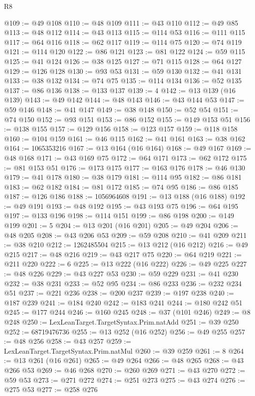 \begin{lexlean}{R8}
\begin{coremodule}
@109 := @49 @108
@110 := @48 @109
@111 := @43 @110
@112 := @49 @85
@113 := @48 @112
@114 := @43 @113
@115 := @114 @53
@116 := @111 @115
@117 := @64 @116
@118 := @62 @117
@119 := @114 @75
@120 := @74 @119
@121 := @114 @120
@122 := @86 @121
@123 := @81 @122
@124 := @59 @115
@125 := @41 @124
@126 := @38 @125
@127 := @71 @115
@128 := @64 @127
@129 := @126 @128
@130 := @93 @53
@131 := @59 @130
@132 := @41 @131
@133 := @38 @132
@134 := @74 @75
@135 := @114 @134
@136 := @52 @135
@137 := @86 @136
@138 := @133 @137
@139 := 4
@142 := @13 @139 (@16 @139)
@143 := @49 @142
@144 := @48 @143
@146 := @43 @144 @53
@147 := @59 @146
@148 := @41 @147
@149 := @38 @148
@150 := @52 @54
@151 := @74 @150
@152 := @93 @151
@153 := @86 @152
@155 := @149 @153 @51
@156 := @138 @155
@157 := @129 @156
@158 := @123 @157
@159 := @118 @158
@160 := @104 @159
@161 := @46 @115
@162 := @41 @161
@163 := @38 @162
@164 := 1065353216
@167 := @13 @164 (@16 @164)
@168 := @49 @167
@169 := @48 @168
@171 := @43 @169 @75
@172 := @64 @171
@173 := @62 @172
@175 := @81 @153 @51
@176 := @173 @175
@177 := @163 @176
@178 := @46 @130
@179 := @41 @178
@180 := @38 @179
@181 := @114 @95
@182 := @86 @181
@183 := @62 @182
@184 := @81 @172
@185 := @74 @95
@186 := @86 @185
@187 := @126 @186
@188 := 1056964608
@191 := @13 @188 (@16 @188)
@192 := @49 @191
@193 := @48 @192
@195 := @43 @193 @75
@196 := @64 @195
@197 := @133 @196
@198 := @114 @151
@199 := @86 @198
@200 := @149 @199
@201 := 5
@204 := @13 @201 (@16 @201)
@205 := @49 @204
@206 := @48 @205
@208 := @43 @206 @53
@209 := @59 @208
@210 := @41 @209
@211 := @38 @210
@212 := 1262485504
@215 := @13 @212 (@16 @212)
@216 := @49 @215
@217 := @48 @216
@219 := @43 @217 @75
@220 := @64 @219
@221 := @211 @220
@222 := 6
@225 := @13 @222 (@16 @222)
@226 := @49 @225
@227 := @48 @226
@229 := @43 @227 @53
@230 := @59 @229
@231 := @41 @230
@232 := @38 @231
@233 := @52 @95
@234 := @86 @233
@236 := @232 @234 @51
@237 := @221 @236
@238 := @200 @237
@239 := @197 @238
@240 := @187 @239
@241 := @184 @240
@242 := @183 @241
@244 := @180 @242 @51
@245 := @177 @244
@246 := @160 @245
@248 := @37 (@101 @246)
@249 := @8 @248
@250 := LexLeanTarget.TargetSyntax.Prim.natAdd
@251 := @39 @250
@252 := 68719476736
@255 := @13 @252 (@16 @252)
@256 := @49 @255
@257 := @48 @256
@258 := @43 @257
@259 := LexLeanTarget.TargetSyntax.Prim.natMul
@260 := @39 @259
@261 := 8
@264 := @13 @261 (@16 @261)
@265 := @49 @264
@266 := @48 @265
@268 := @43 @266 @53
@269 := @46 @268
@270 := @260 @269
@271 := @43 @270
@272 := @59 @53
@273 := @271 @272
@274 := @251 @273
@275 := @43 @274
@276 := @275 @53
@277 := @258 @276

\end{coremodule}
\end{lexlean}
